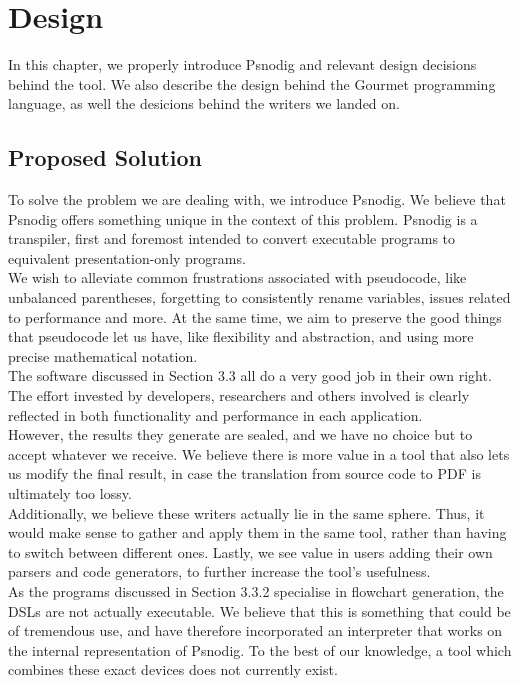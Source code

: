 \chapter{Design}

In this chapter, we properly introduce Psnodig and relevant design decisions behind the tool. We also describe the design behind the Gourmet programming language, as well the desicions behind the writers we landed on.

\section{Proposed Solution}

To solve the problem we are dealing with, we introduce Psnodig. We believe that Psnodig offers something unique in the context of this problem. Psnodig is a transpiler, first and foremost intended to convert executable programs to equivalent presentation-only programs. \\

We wish to alleviate common frustrations associated with pseudocode, like unbalanced parentheses, forgetting to consistently rename variables, issues related to performance and more. At the same time, we aim to preserve the good things that pseudocode let us have, like flexibility and abstraction, and using more precise mathematical notation. \\

The software discussed in Section 3.3 all do a very good job in their own right. The effort invested by developers, researchers and others involved is clearly reflected in both functionality and performance in each application. \\

However, the results they generate are sealed, and we have no choice but to accept whatever we receive. We believe there is more value in a tool that also lets us modify the final result, in case the translation from source code to PDF is ultimately too lossy. \\

Additionally, we believe these writers actually lie in the same sphere. Thus, it would make sense to gather and apply them in the same tool, rather than having to switch between different ones. Lastly, we see value in users adding their own parsers and code generators, to further increase the tool's usefulness. \\

As the programs discussed in Section 3.3.2 specialise in flowchart generation, the DSLs are not actually executable. We believe that this is something that could be of tremendous use, and have therefore incorporated an interpreter that works on the internal representation of Psnodig. To the best of our knowledge, a tool which combines these exact devices does not currently exist.

